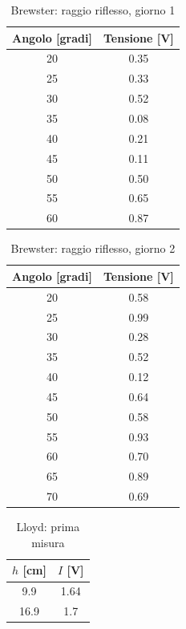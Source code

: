 \documentclass[letterpaper,12pt]{article}
\begin{document}
\begin{table}[h!]
	\centering
	\begin{tabular}{|c|c|}
	\hline
	\textbf{Angolo [gradi]} & \textbf{Tensione [V]} \\
	\hline
	20 & 0.35 \\
	25 & 0.33 \\
	30 & 0.52 \\
	35 & 0.08 \\
	40 & 0.21 \\
	45 & 0.11 \\
	50 & 0.50 \\
	55 & 0.65 \\
	60 & 0.87 \\
	\hline
	\end{tabular}
	\caption{Brewster: raggio riflesso, giorno 1}
	\label{tab:angolo_specchio_tensione_giorno1}
\end{table}

\begin{table}[h!]
	\centering
	\begin{tabular}{|c|c|}
	\hline
	\textbf{Angolo [gradi]} & \textbf{Tensione [V]} \\
	\hline
	20  & 0.58 \\
	25  & 0.99 \\
	30  & 0.28 \\
	35  & 0.52 \\
	40  & 0.12 \\
	45  & 0.64 \\
	50  & 0.58 \\
	55  & 0.93 \\
	60  & 0.70 \\
	65  & 0.89 \\
	70  & 0.69 \\
	\hline
	\end{tabular}
	\caption{Brewster: raggio riflesso, giorno 2}
	\label{tab:angolo_tensione_polar_oriz}
\end{table}

\begin{table}[h!]
	\centering
	\caption{Lloyd: prima misura}
	\label{tab:lloyd1}
	\begin{tabular}{|c|c|}
		\hline
		$h$ [cm] & $I$ [V] \\
		\hline
		9.9      & 1.64    \\
		16.9     & 1.7     \\
		\hline
	\end{tabular}
\end{table}
\end{document}
